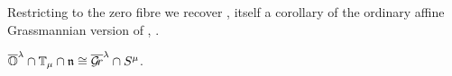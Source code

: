 \documentclass[draft]{article}
\begin{document}
% 
% 
Restricting to the zero fibre we recover \cite[a main result]{dthesis}, itself a corollary of the ordinary affine Grassmannian version of , \cite[Theorem~4.4.1(c)]{mirkovic2019comparison}. 
% 
\begin{corollary}
    \label{cor:mvy}
    $\overline{\mathbb O}^\lambda \cap \mathbb T_\mu\cap\mathfrak n \cong\overline{\mathcal{G}\!r}^\lambda\cap S^\mu$. 
\end{corollary}
\end{document}
